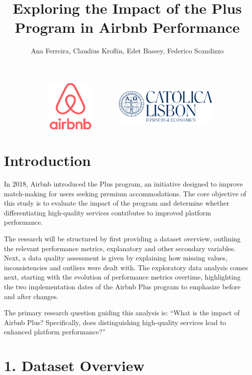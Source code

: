 \documentclass[
  12pt,
]{article}
\title{Exploring the Impact of the Plus Program in Airbnb Performance}
\author{Ana Ferreira, Claudius Kroflin, Edet Bassey, Federico Scandizzo}
\date{}
\begin{document}
\maketitle

\begin{figure}[h]
  \centering
  \includegraphics[width=0.45\textwidth, height=2.5cm]{airbnb.png} 
  \hspace{0.75cm} 
  \includegraphics[width=0.45\textwidth, height=2.5cm]{catolica.png} 
\end{figure}

\section{Introduction}\label{introduction}

In 2018, Airbnb introduced the Plus program, an initiative designed to
improve match-making for users seeking premium accommodations. The core
objective of this study is to evaluate the impact of the program and
determine whether differentiating high-quality services contributes to
improved platform performance.

The research will be structured by first providing a dataset overview,
outlining the relevant performance metrics, explanatory and other
secondary variables. Next, a data quality assessment is given by
explaining how missing values, inconsistencies and outliers were dealt
with. The exploratory data analysis comes next, starting with the
evolution of performance metrics overtime, highlighting the two
implementation dates of the Airbnb Plus program to emphasize before and
after changes.

The primary research question guiding this analysis is: ``What is the
impact of Airbnb Plus? Specifically, does distinguishing high-quality
services lead to enhanced platform performance?''

\newpage

\section{1. Dataset Overview}\label{dataset-overview}
\end{document}
